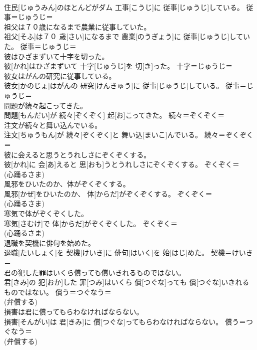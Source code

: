 \documentclass[8pt]{extreport}
\begin{document}
\begin{CJK}{UTF8}{min}
{\\	住民[じゅうみん]のほとんどがダム 工事[こうじ]に 従事[じゅうじ]している。	従事＝じゅうじ＝ 
\\	祖父は７０歳になるまで農業に従事していた。	
\\	祖父[そふ]は７０ 歳[さい]になるまで 農業[のうぎょう]に 従事[じゅうじ]していた。	従事＝じゅうじ＝ 
\\	彼はひざまずいて十字を切った。	
\\	彼[かれ]はひざまずいて 十字[じゅうじ]を 切[き]った。	十字＝じゅうじ＝ 
\\	彼女はがんの研究に従事している。	
\\	彼女[かのじょ]はがんの 研究[けんきゅう]に 従事[じゅうじ]している。	従事＝じゅうじ＝ 
\\	問題が続々起こってきた。	
\\	問題[もんだい]が 続々[ぞくぞく] 起[お]こってきた。	続々＝ぞくぞく＝ 
\\	注文が続々と舞い込んでいる。	
\\	注文[ちゅうもん]が 続々[ぞくぞく]と 舞い込[まいこ]んでいる。	続々＝ぞくぞく＝ 
\\	彼に会えると思うとうれしさにぞくぞくする。	
\\	彼[かれ]に 会[あ]えると 思[おも]うとうれしさにぞくぞくする。	ぞくぞく＝ 
\\	(心踊るさま)
\\	風邪をひいたのか、体がぞくぞくする。	
\\	風邪[かぜ]をひいたのか、 体[からだ]がぞくぞくする。	ぞくぞく＝ 
\\	(心踊るさま)
\\	寒気で体がぞくぞくした。	
\\	寒気[さむけ]で 体[からだ]がぞくぞくした。	ぞくぞく＝ 
\\	(心踊るさま)
\\	退職を契機に俳句を始めた。	
\\	退職[たいしょく]を 契機[けいき]に 俳句[はいく]を 始[はじ]めた。	契機＝けいき＝ 
\\	君の犯した罪はいくら償っても償いきれるものではない。	
\\	君[きみ]の 犯[おか]した 罪[つみ]はいくら 償[つぐな]っても 償[つぐな]いきれるものではない。	償う＝つぐなう＝ 
\\	(弁償する) 
\\	損害は君に償ってもらわなければならない。	
\\	損害[そんがい]は 君[きみ]に 償[つぐな]ってもらわなければならない。	償う＝つぐなう＝ 
\\	(弁償する) 
}
\end{CJK}
\end{document}
